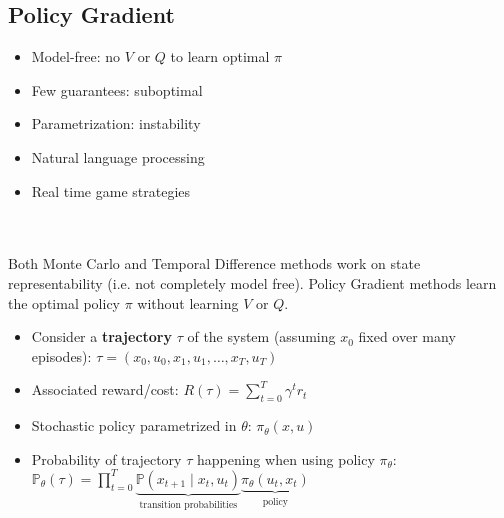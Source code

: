 \subsection{Policy Gradient}
\begin{minipage}{0.33\textwidth}
    \begin{tcolorbox}[colframe=green!50!black, colback=green!5!white, title=Pros, left=0.5mm, right=0.5mm]
    \begin{itemize}[leftmargin=*]
        \item Model-free: no $V$ or $Q$ to learn optimal $\pi$
    \end{itemize}
    \end{tcolorbox}
\end{minipage}
\begin{minipage}{0.33\textwidth}
    \begin{tcolorbox}[colframe=red!50!black, colback=red!5!white, title=Cons, left=0.5mm, right=0.5mm]
    \begin{itemize}[leftmargin=*]
        \item Few guarantees: suboptimal
        \item Parametrization: instability
    \end{itemize}
    \end{tcolorbox}
\end{minipage}
\begin{minipage}{0.33\textwidth}
    \begin{tcolorbox}[colframe=gray!50!black, colback=gray!5!white, title=Examples, left=0.5mm, right=0.5mm]
    \begin{itemize}[leftmargin=*]
        \item Natural language processing
        \item Real time game strategies
    \end{itemize}
    \end{tcolorbox}
\end{minipage}\\ \\
Both Monte Carlo and Temporal Difference methods work on state representability (i.e. not completely model free). Policy Gradient methods learn the optimal policy $\pi$ without learning $V$ or $Q$.
\begin{itemize}
    \item Consider a \textbf{trajectory} $\tau$ of the system (assuming $x_0$ fixed over many episodes): \qquad $\tau = (x_0, u_0, x_1, u_1, \ldots, x_T, u_T)$
    \item Associated reward/cost: \qquad $R(\tau) = \sum_{t=0}^{T} \gamma^t r_t$
    \item Stochastic policy parametrized in $\theta$: \qquad $\pi_{\theta}(x, u)$
    \item Probability of trajectory $\tau$ happening when using policy $\pi_\theta$: \qquad $\mathbb{P}_{\theta}(\tau) = \prod_{t=0}^{T} \underbrace{\mathbb{P}(x_{t+1} \mid x_t, u_t)}_{\text{transition probabilities}} \underbrace{\pi_{\theta}(u_t, x_t)}_{\text{policy}}$
\end{itemize}
